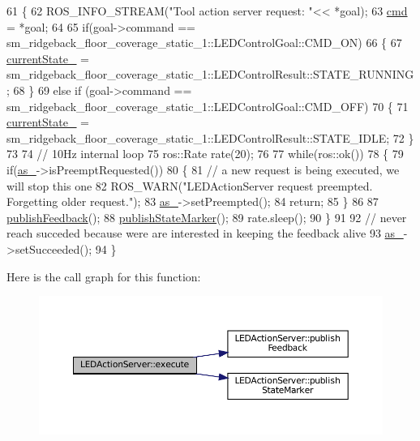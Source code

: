 \begin{DoxyCode}
61 \{
62   ROS\_INFO\_STREAM(\textcolor{stringliteral}{"Tool action server request: "}<< *goal);
63   \hyperlink{classLEDActionServer_a4d3a4c07e7659cdd78228932bb1634d3}{cmd} = *goal;
64 
65   \textcolor{keywordflow}{if}(goal->command == sm\_ridgeback\_floor\_coverage\_static\_1::LEDControlGoal::CMD\_ON)
66   \{
67     \hyperlink{classLEDActionServer_a1dc456e987dc331501ad6ff2215661ff}{currentState\_} =  sm\_ridgeback\_floor\_coverage\_static\_1::LEDControlResult::STATE\_RUNNING;
68   \}
69   \textcolor{keywordflow}{else}  \textcolor{keywordflow}{if} (goal->command == sm\_ridgeback\_floor\_coverage\_static\_1::LEDControlGoal::CMD\_OFF)
70   \{
71     \hyperlink{classLEDActionServer_a1dc456e987dc331501ad6ff2215661ff}{currentState\_} =  sm\_ridgeback\_floor\_coverage\_static\_1::LEDControlResult::STATE\_IDLE;
72   \}
73 
74   \textcolor{comment}{// 10Hz internal loop}
75   ros::Rate rate(20);
76 
77   \textcolor{keywordflow}{while}(ros::ok())
78   \{
79     \textcolor{keywordflow}{if}(\hyperlink{classLEDActionServer_a61d21c77642081acf017d4ebd65b2de0}{as\_}->isPreemptRequested())
80     \{
81        \textcolor{comment}{// a new request is being executed, we will stop this one}
82        ROS\_WARN(\textcolor{stringliteral}{"LEDActionServer request preempted. Forgetting older request."});
83        \hyperlink{classLEDActionServer_a61d21c77642081acf017d4ebd65b2de0}{as\_}->setPreempted(); 
84        \textcolor{keywordflow}{return};
85     \}
86     
87     \hyperlink{classLEDActionServer_a25c93d4e7ecdacbb4f5b090d7789aa36}{publishFeedback}();
88     \hyperlink{classLEDActionServer_a73bb754ac2347c50660624ad92315895}{publishStateMarker}();
89     rate.sleep();
90   \}
91 
92    \textcolor{comment}{// never reach succeded because were are interested in keeping the feedback alive}
93    \hyperlink{classLEDActionServer_a61d21c77642081acf017d4ebd65b2de0}{as\_}->setSucceeded();
94 \}
\end{DoxyCode}
Here is the call graph for this function\+:
\nopagebreak
\begin{figure}[H]
\begin{center}
\leavevmode
\includegraphics[width=350pt]{classLEDActionServer_adf0a5d17104919195a605c89ee488af1_cgraph}
\end{center}
\end{figure}
\mbox{\label{classLEDActionServer_a25c93d4e7ecdacbb4f5b090d7789aa36}} 
